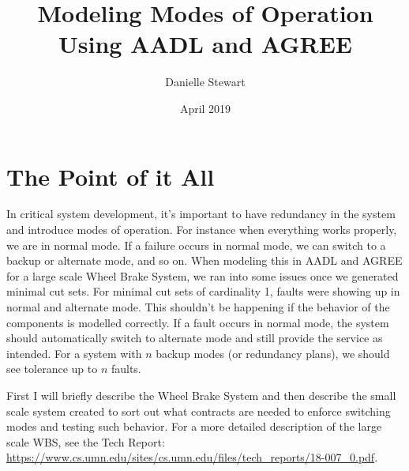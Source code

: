 \documentclass{article}
\title{Modeling Modes of Operation \\ Using AADL and AGREE } %
\author{Danielle Stewart} %
\date{April 2019} %
\begin{document}
\maketitle %





\section{The Point of it All}

In critical system development, it's important to have redundancy in the system and introduce modes of operation. For instance when everything works properly, we are in normal mode. If a failure occurs in normal mode, we can switch to a backup or alternate mode, and so on. When modeling this in AADL and AGREE for a large scale Wheel Brake System, we ran into some issues once we generated minimal cut sets. For minimal cut sets of cardinality 1, faults were showing up in normal and alternate mode. This shouldn't be happening if the behavior of the components is modelled correctly. If a fault occurs in normal mode, the system should automatically switch to alternate mode and still provide the service as intended. For a system with $n$ backup modes (or redundancy plans), we should see tolerance up to $n$ faults.

First I will briefly describe the Wheel Brake System and then describe the small scale system created to sort out what contracts are needed to enforce switching modes and testing such behavior. For a more detailed description of the large scale WBS, see the Tech Report: \url{https://www.cs.umn.edu/sites/cs.umn.edu/files/tech_reports/18-007_0.pdf}.
 
\end{document}
